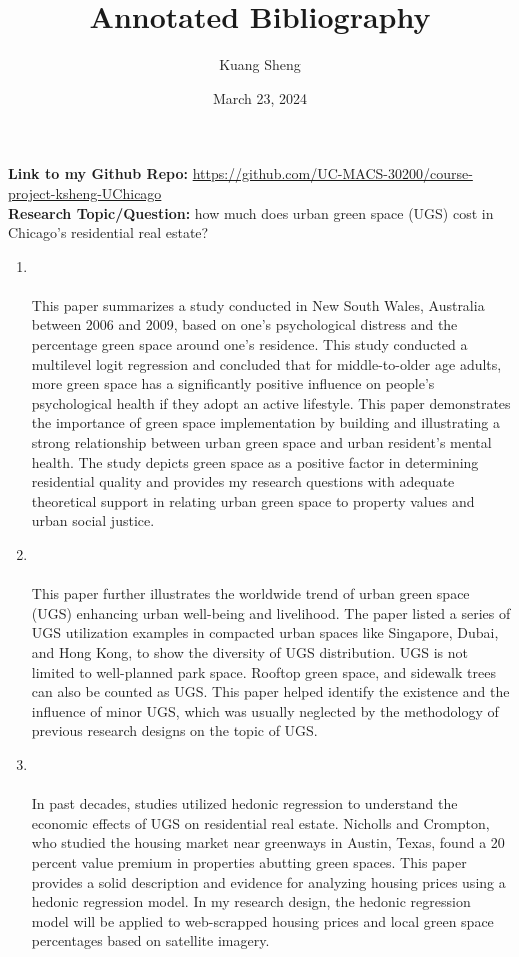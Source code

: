 \documentclass{article}
\title{Annotated Bibliography}
\author{Kuang Sheng}
\date{March 23, 2024}
\begin{document}
\maketitle


\textbf{Link to my Github Repo:} \href{Add link to your github repo here}{https://github.com/UC-MACS-30200/course-project-ksheng-UChicago}\\
\textbf{Research Topic/Question:} how much does urban green space (UGS) cost in Chicago’s residential real estate?


\begin{enumerate}
    \item  {}\\ \\ This paper summarizes a study conducted in New South Wales, Australia between 2006 and 2009, based on one’s psychological distress and the percentage green space around one’s residence. This study conducted a multilevel logit regression and concluded that for middle-to-older age adults, more green space has a significantly positive influence on people’s psychological health if they adopt an active lifestyle. This paper demonstrates the importance of green space implementation by building and illustrating a strong relationship between urban green space and urban resident’s mental health. The study depicts green space as a positive factor in determining residential quality and provides my research questions with adequate theoretical support in relating urban green space to property values and urban social justice.
    
    \item  {}\\ \\ This paper further illustrates the worldwide trend of urban green space (UGS) enhancing urban well-being and livelihood. The paper listed a series of UGS utilization examples in compacted urban spaces like Singapore, Dubai, and Hong Kong, to show the diversity of UGS distribution. UGS is not limited to well-planned park space. Rooftop green space, and sidewalk trees can also be counted as UGS. This paper helped identify the existence and the influence of minor UGS, which was usually neglected by the methodology of previous research designs on the topic of UGS.

    \item  {}\\ \\ In past decades, studies utilized hedonic regression to understand the economic effects of UGS on residential real estate. Nicholls and Crompton, who studied the housing market near greenways in Austin, Texas, found a 20 percent value premium in properties abutting green spaces. This paper provides a solid description and evidence for analyzing housing prices using a hedonic regression model. In my research design, the hedonic regression model will be applied to web-scrapped housing prices and local green space percentages based on satellite imagery.


\end{enumerate}
\end{document}
